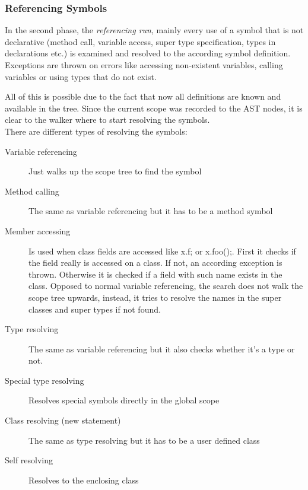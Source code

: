 \subsubsection{Referencing Symbols}
In the second phase, the \emph{referencing run}, mainly every use of a symbol
that is not declarative (method call, variable access, super type specification,
types in declarations etc.) is examined and resolved to the according symbol
definition. Exceptions are thrown on errors like accessing non-existent
variables, calling variables or using types that do not exist.

All of this is possible due to the fact that now all definitions are known
and available in the tree. Since the current scope was recorded to the AST
nodes, it is clear to the walker where to start resolving the symbols.\\

\noindent There are different types of resolving the symbols:
\begin{description}
\item[Variable referencing]
Just walks up the scope tree to find the symbol
\item[Method calling]
The same as variable referencing but it has to be a method symbol
\item[Member accessing]
Is used when class fields are accessed like x.f; or x.foo();. First it checks
if the field really is accessed on a class. If not, an according exception
is thrown. Otherwise it is checked if a field with such name exists
in the class. Opposed to normal variable referencing, the search does not walk
the scope tree upwards, instead, it tries to resolve the names in the super classes
and super types if not found.
\item[Type resolving]
The same as variable referencing but it also checks whether it's a type or not.
\item[Special type resolving]
Resolves special symbols directly in the global scope
\item[Class resolving (new statement)]
The same as type resolving but it has to be a user defined class
\item[Self resolving]
Resolves to the enclosing class
\end{description}

